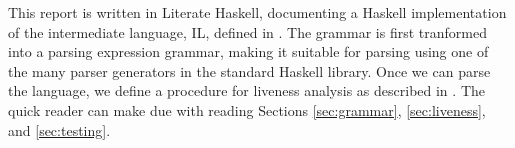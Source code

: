 This report is written in Literate Haskell, documenting a Haskell
implementation of the intermediate language, IL, defined in \cite[Section 3.2
(p.  36)]{torben}. The grammar is first tranformed into a parsing expression
grammar, making it suitable for parsing using one of the many parser generators
in the standard Haskell library. Once we can parse the language, we define a
procedure for liveness analysis as described in \cite[Section 3.4
(p.38)]{torben}. The quick reader can make due with reading Sections
\ref{sec:grammar}, \ref{sec:liveness}, and \ref{sec:testing}.
